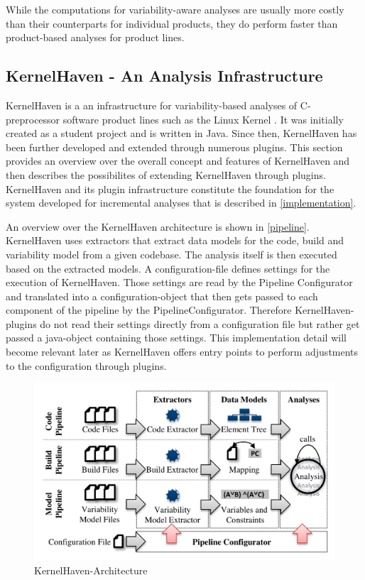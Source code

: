 \documentclass[a4paper]{article}
\begin{document}
While the computations for variability-aware analyses are usually more costly than their counterparts for individual products, they do perform faster than product-based analyses for product lines.

\subsection{KernelHaven - An Analysis Infrastructure}\label{kernelhaven}

KernelHaven is a an infrastructure for variability-based analyses of C-preprocessor software product lines such as the Linux Kernel \cite{KroeherEl-SharkawySchmid18}. It was initially created as a student project and is written in Java.  Since then, KernelHaven has been further developed and extended through numerous plugins. This section  provides an overview over the overall concept and features of KernelHaven and then describes the possibilites of extending KernelHaven through plugins. KernelHaven and its plugin infrastructure constitute the foundation for the system developed for incremental analyses that is described in \autoref{implementation}. 

An overview over the KernelHaven architecture is shown in \autoref{pipeline}. KernelHaven uses extractors that extract data models for the code, build and variability model from a given codebase. The analysis itself is then executed based on the extracted models. A configuration-file defines settings for the execution of KernelHaven. Those settings are read by the Pipeline Configurator and translated into a configuration-object that then gets passed to each component of the pipeline by the PipelineConfigurator. Therefore KernelHaven-plugins do not read their settings directly from a configuration file but rather get passed a java-object containing those settings. This implementation detail will become relevant later as KernelHaven offers entry points to perform adjustments to the configuration through plugins.

\begin{figure}[h] 
  \centering
  \begin{minipage}[b]{1\textwidth} 
    \caption[KernelHaven-Pipeline]{KernelHaven-Architecture \cite{KroeherEl-SharkawySchmid18}}\label{pipeline}
    \includegraphics[width=1\textwidth]{img/KernelHaven-Pipeline.png}
  \end{minipage}
\end{figure}
\end{document}
